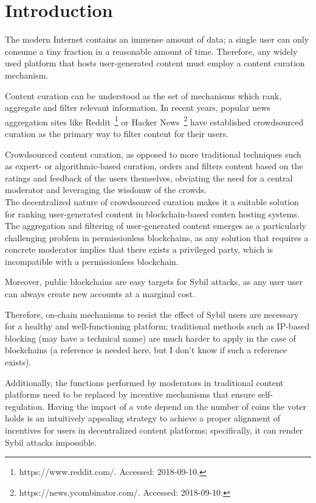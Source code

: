 \section{Introduction}
    
  The modern Internet contains an immense amount of data; a single user can only consume a tiny fraction in a reasonable amount of time. Therefore, any widely used platform that hosts user-generated content must employ a content curation mechanism. 
  
  Content curation can be understood as the set of mechanisms which rank, aggregate and filter relevant information. In recent years, popular news aggregation sites like Reddit~\footnote{https://www.reddit.com/. Accessed: 2018-09-10.} or Hacker News~\footnote{https://news.ycombinator.com/. Accessed: 2018-09-10.} have established crowdsourced curation as the primary way to filter content for their users.
  
   Crowdsourced content curation, as opposed to more traditional techniques such as expert- or algorithmic-based curation, orders and filters content based on the ratings and feedback of the users themselves, obviating the need for a central moderator and leveraging the wisdomw of the crowds.\\
  
  The decentralized nature of crowdsourced curation makes it a suitable solution for ranking user-generated content in blockchain-based conten hosting systems. The aggregation and filtering of user-generated content emerges as a particularly challenging problem in permissionless blockchains, as any solution that requires a concrete moderator implies that there exists a privileged party, which is incompatible with a permissionless blockchain.
  
   Moreover, public blockchains are easy targets for Sybil attacks, as any user user can always create new accounts at a marginal cost. 
   
   Therefore, on-chain mechanisms to resist the effect of Sybil users are necessary for a healthy and well-functioning platform; traditional methods such as IP-based blocking (may have a technical name) are much harder to apply in the case of blockchains (a reference is needed here, but I don't know if such a reference exists). 
   
   Additionally, the functions performed by moderators in traditional content platforms need to be replaced by incentive mechanisms that ensure self-regulation. Having the impact of a vote depend on the number of coins the voter holds is an intuitively appealing strategy to achieve a proper alignment of incentives for users in decentralized content platforms; specifically, it can render Sybil attacks impossible. 
   
